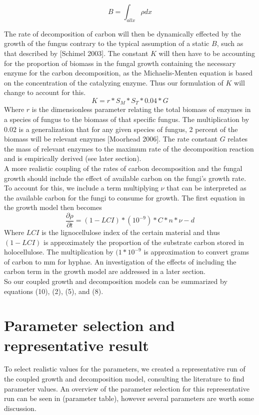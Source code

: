 \documentclass[10pt]{article}
\begin{document}
\begin{equation} \label {eq}
    B = \int_{all x}\rho dx
\end{equation}

The rate of decomposition of carbon will then be dynamically effected by the growth of the fungus contrary to the typical assumption of a static $B$, such as that described by [Schimel 2003]. The constant $K$ will then have to be accounting for the proportion of biomass in the fungal growth containing the necessary enzyme for the carbon decomposition, as the Michaelis-Menten equation is based on the concentration of the catalyzing enzyme. Thus our formulation of $K$ will change to account for this. 
\begin{equation} \label {eq}
    K = r*S_{M}*S_{T}*0.04*G
\end{equation}
Where $r$ is the dimensionless parameter relating the total biomass of enzymes in a species of fungus to the biomass of that specific fungus. The multiplication by $0.02$ is a generalization that for any given species of fungus, 2 percent of the biomass will be relevant enzymes [Moorhead 2006]. The rate constant $G$ relates the mass of relevant enzymes to the maximum rate of the decomposition reaction and is empirically derived (see later section). \\
A more realistic coupling of the rates of carbon decomposition and the fungal growth should include the effect of available carbon on the fungi's growth rate. To account for this, we include a term multiplying $\nu$ that can be interpreted as the available carbon for the fungi to consume for growth. The first equation in the growth model then becomes
\begin{equation} \label{eq}
    \frac{\partial \rho}{\partial t} = (1-LCI)*(10^{-9})*C*n*\nu - d
\end{equation}
Where $LCI$ is the lignocellulose index of the certain material and thus $(1-LCI)$ is approximately the proportion of the substrate carbon stored in holocellulose. The multiplication by $(1*10^{-9}$ is approximation to convert grams of carbon to mm for hyphae. An investigation of the effects of including the carbon term in the growth model are addressed in a later section. \\
So our coupled growth and decomposition models can be summarized by equations (10), (2), (5), and (8).

\section*{Parameter selection and representative result}
To select realistic values for the parameters, we created a representative run of the coupled growth and decomposition model, consulting the literature to find parameter values. An overview of the parameter selection for this representative run can be seen in (parameter table), however several parameters are worth some discussion. 
\end{document}
